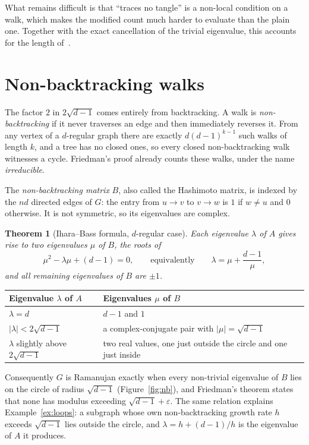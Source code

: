 \documentclass[11pt,letterpaper]{article}
\newtheorem{theorem}{Theorem}
\theoremstyle{definition}
\theoremstyle{remark}
\newcommand{\edge}{2\sqrt{d-1}}
\newcommand{\eps}{\varepsilon}
\begin{document}
What remains difficult is that ``traces no tangle'' is a non-local condition on a walk, which
makes the modified count much harder to evaluate than the plain one. Together with the exact
cancellation of the trivial eigenvalue, this accounts for the length of~\cite{F}.

\section{Non-backtracking walks}

The factor $2$ in $\edge$ comes entirely from backtracking. A walk is \emph{non-backtracking} if it
never traverses an edge and then immediately reverses it. From any vertex of a $d$-regular graph
there are exactly $d(d-1)^{k-1}$ such walks of length $k$, and a tree has no closed ones, so every
closed non-backtracking walk witnesses a cycle. Friedman's proof already counts these walks,
under the name \emph{irreducible}.

The \emph{non-backtracking matrix} $B$, also called the Hashimoto matrix, is indexed by the
$nd$ directed edges of $G$: the entry from $u\to v$ to $v\to w$ is $1$ if $w\ne u$ and $0$
otherwise. It is not symmetric, so its eigenvalues are complex.

\begin{theorem}[Ihara--Bass formula, $d$-regular case]\label{thm:ib}
Each eigenvalue $\lambda$ of $A$ gives rise to two eigenvalues $\mu$ of $B$, the roots of
\[
  \mu^2-\lambda\mu+(d-1)=0,\qquad\text{equivalently}\qquad\lambda=\mu+\frac{d-1}{\mu},
\]
and all remaining eigenvalues of $B$ are $\pm1$.
\end{theorem}

\begin{center}
\begin{tabular}{@{}ll@{}}
  \toprule
  Eigenvalue $\lambda$ of $A$ & Eigenvalues $\mu$ of $B$\\
  \midrule
  $\lambda=d$ & $d-1$ and $1$\\
  $|\lambda|<\edge$ & a complex-conjugate pair with $|\mu|=\sqrt{d-1}$\\
  $\lambda$ slightly above $\edge$ & two real values, one just outside the circle and one just inside\\
  \bottomrule
\end{tabular}
\end{center}

Consequently $G$ is Ramanujan exactly when every non-trivial eigenvalue of $B$ lies on the circle
of radius $\sqrt{d-1}$ (Figure~\ref{fig:nb}), and Friedman's theorem states that none has modulus
exceeding $\sqrt{d-1}+\eps$. The same relation explains Example~\ref{ex:loops}: a subgraph whose
own non-backtracking growth rate $h$ exceeds $\sqrt{d-1}$ lies outside the circle, and
$\lambda=h+(d-1)/h$ is the eigenvalue of $A$ it produces.
\end{document}
